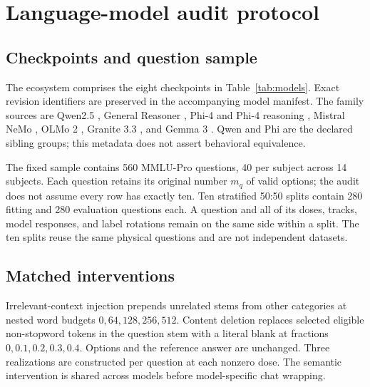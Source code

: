\section{Language-model audit protocol}
\label{app:llm-protocol}

\subsection{Checkpoints and question sample}
The ecosystem comprises the eight checkpoints in Table~\ref{tab:models}. Exact revision identifiers are preserved in the accompanying model manifest. The family sources are Qwen2.5 \citep{qwen2025qwen25}, General Reasoner \citep{ma2025generalreasoner}, Phi-4 and Phi-4 reasoning \citep{abdin2024phi4,phi4reasoning2025}, Mistral NeMo \citep{mistralnemo2024}, OLMo 2 \citep{olmo22025}, Granite 3.3 \citep{granite332025}, and Gemma 3 \citep{gemma32025}. Qwen and Phi are the declared sibling groups; this metadata does not assert behavioral equivalence.



The fixed sample contains 560 MMLU-Pro questions, 40 per subject across 14 subjects. Each question retains its original number $m_q$ of valid options; the audit does not assume every row has exactly ten. Ten stratified 50:50 splits contain 280 fitting and 280 evaluation questions each. A question and all of its doses, tracks, model responses, and label rotations remain on the same side within a split. The ten splits reuse the same physical questions and are not independent datasets.

\subsection{Matched interventions}
Irrelevant-context injection prepends unrelated stems from other categories at nested word budgets $0,64,128,256,512$. Content deletion replaces selected eligible non-stopword tokens in the question stem with a literal blank at fractions $0,0.1,0.2,0.3,0.4$. Options and the reference answer are unchanged. Three realizations are constructed per question at each nonzero dose. The semantic intervention is shared across models before model-specific chat wrapping.

